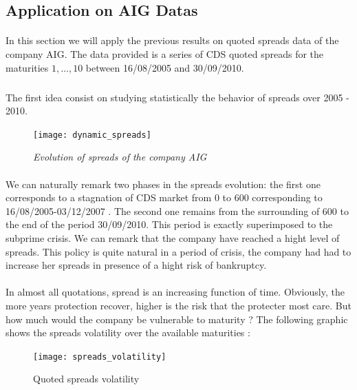 
\subsection{Application on AIG Datas}
\label{sec:appl-aig-datas}
\paragraph{}
In this section we will apply the previous results on quoted spreads data of the
company  AIG. The  data provided  is  a series  of  CDS quoted  spreads for  the
maturities $1,\dots,10$ between 16/08/2005 and 30/09/2010.

\subparagraph{}
The first  idea consist on studying  statistically the behavior of  spreads over
2005 - 2010. 

\begin{figure}[H]
  \centering 
  \texttt{[image: dynamic\_spreads]}
  \caption{\it Evolution of spreads of the company AIG }
  \label{fig:5}
\end{figure}
\paragraph{}
We  can naturally  remark two  phases in  the spreads  evolution: the  first one
corresponds  to a  stagnation of  CDS  market from  0 to  600 corresponding  to
16/08/2005-03/12/2007 .  The second one remains from the surrounding of 600 to
the end  of the period  30/09/2010. This period  is exactly superimposed  to the
subprime crisis. We  can remark that the  company have reached a  hight level of
spreads. This policy  is quite  natural in  a period of  crisis, the  company had  had to
increase her spreads in presence of a hight risk of bankruptcy. \\

\paragraph{}
In almost all  quotations, spread is an increasing function  of time. Obviously,
the more  years protection recover, higher  is the risk that  the protecter most
care. But how much  would the company be vulnerable to  maturity ? The following
graphic shows the spreads volatility over the available maturities :

\begin{figure}[H]
  \centering
\label{fig:6}
  \texttt{[image: spreads\_volatility]}
  \caption{Quoted spreads volatility }
\end{figure}

